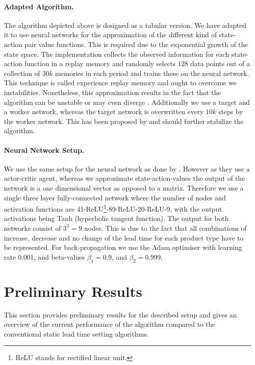 \documentclass[envcountsame]{llncs}
\begin{document}
\paragraph*{Adapted Algorithm.}
The algorithm depicted above is designed as a tabular version. We have adapted it to use neural
networks for the approximation of the different kind of state-action pair value functions. This is
required due to the exponential growth of the state space. The implementation collects the observed
information for each state-action function in a replay memory and randomly selects \(128\) data
points out of a collection of \(30k\) memories in each period and trains these on the neural
network. This technique is called experience replay memory
\citep{lin1993reinforcement,mnih2015human} and ought to overcome we instabilities. Nonetheless, this
approximation results in the fact that the algorithm can be unstable or may even diverge
\citep{tsitsiklis1997analysis}. Additionally we use a target and a worker network, whereas the
target network is overwritten every \(10k\) steps by the worker network. This has been proposed by
\cite{mnih2015human} and should further stabilize the algorithm.

\paragraph*{Neural Network Setup.}
We use the same setup for the neural network as done by \cite{Schneckenreither2019}. However as they
use a actor-critic agent, whereas we approximate state-action-values the output of the network is a
one dimensional vector as opposed to a matrix. Therefore we use a single three layer fully-connected
network where the number of nodes and activation functions are 41-ReLU\footnote{ReLU stands for
  rectified linear unit.}-89-ReLU-20-ReLU-9, with the output activations being Tanh (hyperbolic
tangent function).
The output for both networks consist of $3^{2}=9$ nodes. This is due to the fact that all
combinations of increase, decrease and no change of the lead time for each product type have to be
represented.
For back-propagation we use the Adam optimiser with learning rate \(0.001\), and beta-values
\(\beta_{1}=0.9\), and \(\beta_{2}=0.999\).


\section{Preliminary Results}
\label{sec:Preliminary}

This section provides preliminary results for the described setup and gives an overview of the
current performance of the algorithm compared to the conventional static lead time setting
algorithms.
\end{document}
